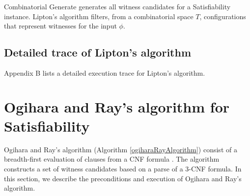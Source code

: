 \begin{center}
\end{center}	

{\sc Combinatorial Generate} generates all witness candidates for a {\sc Satisfiability} instance.  Lipton's algorithm filters, from a combinatorial space $T$, configurations that represent witnesses for the input $\phi$.

	\subsection{Detailed trace of Lipton's algorithm}	
Appendix B lists a detailed execution trace for Lipton's algorithm.


\section{Ogihara and Ray's algorithm for {\sc Satisfiability}}


Ogihara and Ray's algorithm (Algorithm \ref{ogiharaRayAlgorithm}) consist of a breadth-first evaluation of clauses from a CNF formula \cite{Ogihara:1996:BFS:898228,Ogihara97dna-basedparallel}.  The algorithm constructs a set of witness candidates based on a parse of a 3-CNF formula.  In this section, we describe the preconditions and execution of Ogihara and Ray's algorithm.

